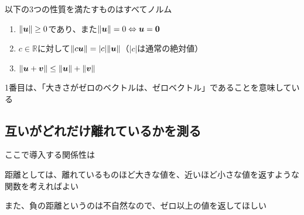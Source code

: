 \documentclass[../book_half_step_linear]{subfiles}
\begin{document}
以下の3つの性質を満たすものはすべてノルム
\begin{enumerate}
  \item $\lVert \vb*{u} \rVert \geq 0$であり、また$\lVert \vb*{u} \rVert = 0 \Leftrightarrow \vb*{u} = \vb*{0}$
  \item $c \in \mathbb{R}$に対して$\lVert c\vb*{u} \rVert = |c|\lVert \vb*{u} \rVert$（$|c|$は通常の絶対値）
  \item $\lVert \vb*{u} + \vb*{v} \rVert \leq \lVert \vb*{u} \rVert + \lVert \vb*{v} \rVert$
\end{enumerate}
1番目は、「大きさがゼロのベクトルは、ゼロベクトル」であることを意味している

\sectionline
\subsection{互いがどれだけ離れているかを測る}

ここで導入する関係性は

距離としては、離れているものほど大きな値を、近いほど小さな値を返すような関数を考えればよい

また、負の距離というのは不自然なので、ゼロ以上の値を返してほしい

\br
\end{document}
